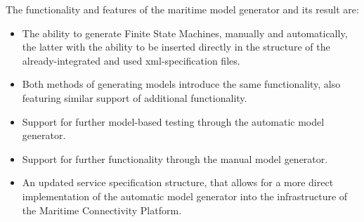 The functionality and features of the maritime model generator and its result are:
\begin{itemize}
  \item The ability to generate Finite State Machines, manually and automatically, the latter with the ability to be inserted directly in the structure of the already-integrated and used xml-specification files.
  \item Both methods of generating models introduce the same functionality, also featuring similar support of additional functionality.
  \item Support for further model-based testing through the automatic model generator.
  \item Support for further functionality through the manual model generator.
  \item An updated service specification structure, that allows for a more direct implementation of the automatic model generator into the infrastructure of the Maritime Connectivity Platform.
\end{itemize}


